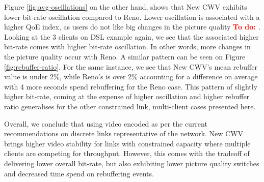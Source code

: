 \documentclass[10pt,sigconf]{acmart}
\newcommand{\todo}[1]{\textbf{\textcolor{red}{To do: #1}}}
\begin{document}
Figure \ref{fig:avg-oscillations} on the other hand, shows that New CWV exhibits lower bit-rate oscillation compared to Reno. Lower oscillation is associated with a higher QoE index, as users do not like big changes in the picture quality \todo{\cite{}}. Looking at the 3 clients on DSL example again, we see that the associated higher bit-rate comes with higher bit-rate oscillation. In other words, more changes in the picture quality occur with Reno. A similar pattern can be seen on Figure \ref{fig:rebuffer-ratio}. For the same instance, we see that New CWV's mean rebuffer value is under 2\%, while Reno's is over 2\% accounting for a difference on average with 4 more seconds spend rebuffering for the Reno case. This pattern of slightly higher bit-rate, coming at the expense of higher oscillation and higher rebuffer ratio generalises for the other constrained link, multi-client cases presented here.

Overall, we conclude that using video encoded as per the current recommendations on discrete links representative of the network. New CWV brings higher video stability for links with constrained capacity where multiple clients are competing for throughput. However, this comes with the tradeoff of delivering lower overall bit-rate, but also exhibiting lower picture quality switches and decreased time spend on rebuffering events.

\end{document}

